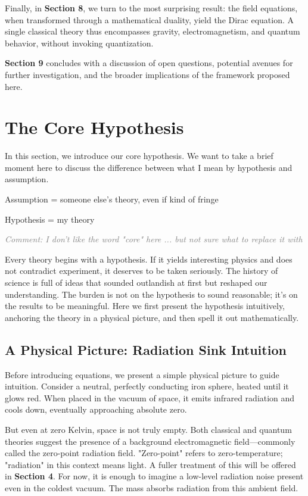\documentclass {article}
\newcommand{\comment}[1]{\textcolor{gray}{\small\textit{Comment: #1}}}
\begin{document}
Finally, in \textbf{Section 8}, we turn to the most surprising result: the field equations, when transformed through a mathematical duality, yield the Dirac equation. A single classical theory thus encompasses gravity, electromagnetism, and quantum behavior, without invoking quantization.

\textbf{Section 9} concludes with a discussion of open questions, potential avenues for further investigation, and the broader implications of the framework proposed here.

\section{The Core Hypothesis}

In this section, we introduce our core hypothesis. We want to take a brief moment here to discuss the difference between what I mean by hypothesis and assumption. 

Assumption = someone else's theory, even if kind of fringe

Hypothesis = my theory

\comment{I don't like the word "core" here ... but not sure what to replace it with}

Every theory begins with a hypothesis. If it yields interesting physics and does not contradict experiment, it deserves to be taken seriously. The history of science is full of ideas that sounded outlandish at first but reshaped our understanding. The burden is not on the hypothesis to sound reasonable; it’s on the results to be meaningful.  Here we first present the hypothesis intuitively, anchoring the theory in a physical picture, and then spell it out mathematically.


\subsection{A Physical Picture: Radiation Sink Intuition }
\label{subsec:intuition}

Before introducing equations, we present a simple physical picture to guide intuition. Consider a neutral, perfectly conducting iron sphere, heated until it glows red. When placed in the vacuum of space, it emits infrared radiation and cools down, eventually approaching absolute zero.

But even at zero Kelvin, space is not truly empty. Both classical and quantum theories suggest the presence of a background electromagnetic field—commonly called the zero-point radiation field. "Zero-point" refers to zero-temperature; "radiation" in this context means light. A fuller treatment of this will be offered in \textbf{Section 4}. For now, it is enough to imagine a low-level radiation noise present even in the coldest vacuum. The mass absorbs radiation from this ambient field.
\end{document}
